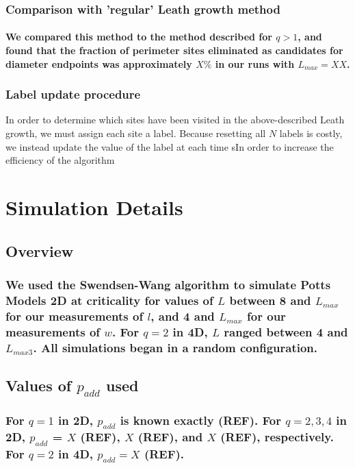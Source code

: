 \documentclass[pre,preprint]{revtex4-1}
\begin{document}
\subsubsection{Comparison with 'regular' Leath growth method}
\label{sec-2.4.7}
\paragraph{We compared this method to the method described for $q>1$, and found that the fraction of perimeter sites eliminated as candidates for diameter endpoints was approximately $X\%$ in our runs with $L_{max}=XX$.}
\label{sec-2.4.7.1}
\subsubsection{Label update procedure}
\label{sec-2.4.8}

In order to determine which sites have been visited in the above-described Leath growth, we must assign each site a label.  Because resetting all $N$ labels is costly, we instead update the value of the label at each time sIn order to increase the efficiency of the algorithm
\section{Simulation Details}
\label{sec-3}
\subsection{Overview}
\label{sec-3.1}
\subsubsection{We used the Swendsen-Wang algorithm to simulate Potts Models 2D at criticality for values of $L$ between 8 and $L_{max}$ for our  measurements of $l$, and 4 and $L_{max}$ for our measurements of $w$.  For $q=2$ in 4D, $L$ ranged between 4 and $L_{max3}$.  All simulations began in a random configuration.}
\label{sec-3.1.1}
\subsection{Values of $p_{add}$ used}
\label{sec-3.2}
\subsubsection{For $q=1$ in 2D, $p_{add}$ is known exactly (REF).  For $q=2,3,4$ in 2D, $p_{add}$ = $X$ (REF), $X$ (REF), and $X$ (REF), respectively. For $q=2$ in 4D, $p_{add}=X$ (REF).}
\label{sec-3.2.1}
\end{document}
